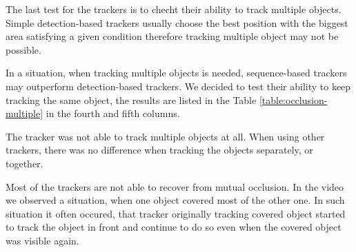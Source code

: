 The last test for the trackers is to checht their ability to track multiple objects. Simple
detection-based trackers usually choose the best position with the biggest area
satisfying a given condition therefore tracking multiple object may not be possible.

In a situation, when tracking multiple objects is needed, sequence-based
trackers may outperform detection-based trackers. We decided to test their
ability to keep tracking the same object, the results are listed in the Table
\ref{table:occlusion-multiple} in the fourth and fifth columns.

The \simback{} tracker was not able to track multiple objects at all. When
using other trackers, there was no difference when tracking the objects
separately, or together. 

Most of the trackers are not able to recover from mutual occlusion. In the
video we observed a situation, when one object covered most of the other one.
In such situation it often occured, that tracker originally tracking covered
object started to track the object in front and continue to do so even when the
covered object was visible again.


